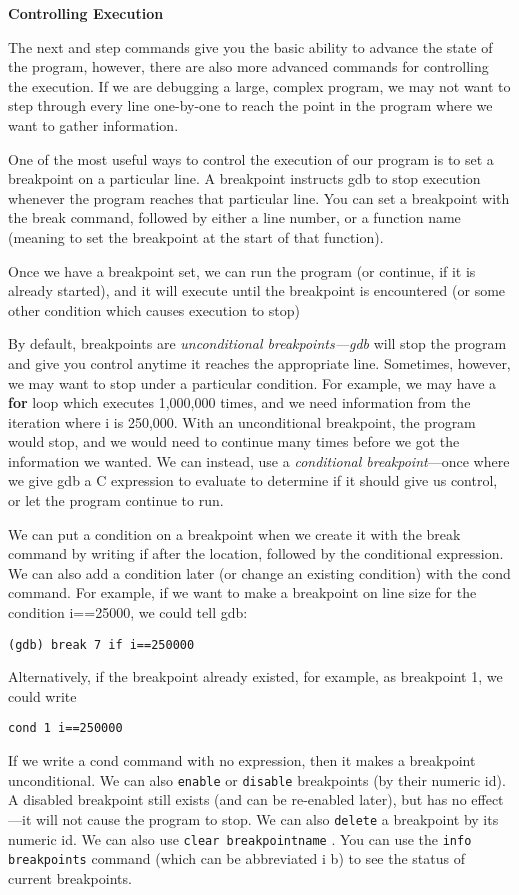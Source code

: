 \documentclass[11pt, a4paper]{article}
\begin{document}
\textbf{Controlling Execution}


The next and step commands give you the basic ability to advance the state of the program, however, there are also more advanced commands for controlling the execution. If we are debugging a large, complex program, we may not want to step through every line one-by-one to reach the point in the program where we want to gather information.

One of the most useful ways to control the execution of our program is to set a breakpoint on a particular line. A breakpoint instructs gdb to stop execution whenever the program reaches that particular line. You can set a breakpoint with the break command, followed by either a line number, or a function name (meaning to set the breakpoint at the start of that function).

Once we have a breakpoint set, we can run the program (or continue, if it is already started), and it will execute until the breakpoint is encountered (or some other condition which causes execution to stop)

By default, breakpoints are \textit{unconditional breakpoints—gdb} will stop the program and give you control anytime it reaches the appropriate line. Sometimes, however, we may want to stop under a particular condition. For example, we may have a \textbf{for} loop which executes 1,000,000 times, and we need information from the iteration where i is 250,000. With an unconditional breakpoint, the program would stop, and we would need to continue many times before we got the information we wanted. We can instead, use a \textit{conditional breakpoint}—once where we give gdb a C expression to evaluate to determine if it should give us control, or let the program continue to run.


We can put a condition on a breakpoint when we create it with the break command by writing if after the location, followed by the conditional expression. We can also add a condition later (or change an existing condition) with the cond command. For example, if we want to make a breakpoint on line size for the condition i==25000, we could tell gdb:

\texttt{(gdb) break 7 if i==250000} 

Alternatively, if the breakpoint already existed, for example, as breakpoint 1, we could write


\texttt{cond 1 i==250000}

If we write a cond command with no expression, then it makes a breakpoint unconditional. We can also \texttt{enable} or \texttt{disable} breakpoints (by their numeric id). A disabled breakpoint still exists (and can be re-enabled later), but has no effect—it will not cause the program to stop. We can also \texttt{delete} a breakpoint by its numeric id. We can also use \texttt{clear breakpointname} . You can use the \texttt{info breakpoints} command (which can be abbreviated i b) to see the status of current breakpoints.
\end{document}
